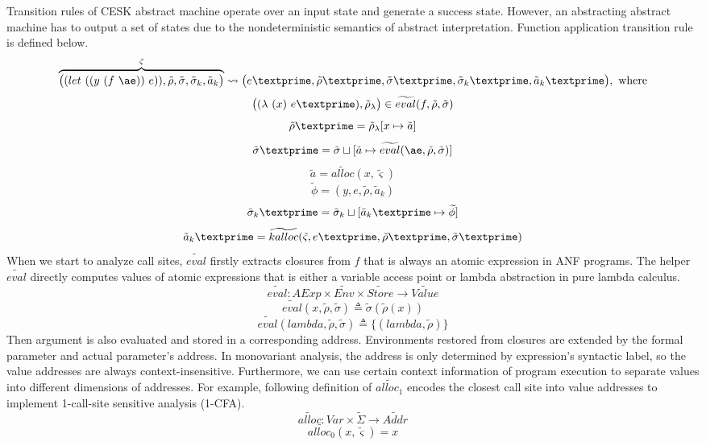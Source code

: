 \documentclass{article}
\begin{document}
Transition rules of CESK abstract machine operate over an input state and generate a success state.
However, an abstracting abstract machine has to output a set of states due to the nondeterministic semantics of abstract interpretation.
Function application transition rule is defined below.
\[
\overbrace{
\big((let\ ((y\ (f\ \ae))\ e)), \tilde{\rho}, \tilde{\sigma}, \tilde{\sigma}_k, \tilde{a}_k \big)
}^{\tilde{\varsigma}}
\leadsto \big(e\textprime,\tilde{\rho}\textprime, \tilde{\sigma}\textprime, \tilde{\sigma}_k\textprime, \tilde{a}_k\textprime \big), \mbox{ where}
\]
\[
\big((\lambda\ (x)\ e\textprime), \tilde{\rho}_{\lambda}  \big) \in \widetilde{eval}(f, \tilde{\rho}, \tilde{\sigma})
\]
\[
\tilde{\rho}\textprime = \tilde{\rho}_{\lambda}[x \mapsto \tilde{a}]
\]
\[
\tilde{\sigma}\textprime = \tilde{\sigma} \sqcup [\tilde{a} \mapsto \widetilde{eval}(\ae, \tilde{\rho}, \tilde{\sigma})]
\]
\[
\tilde{a} = \widetilde{alloc}(x, \tilde{\varsigma})
\]
\[
\widetilde{\phi} = {(y, e, \tilde{\rho}, \tilde{a}_k)}
\]
\[
\tilde{\sigma}_k\textprime = \tilde{\sigma}_k \sqcup [\tilde{a}_k\textprime \mapsto \widetilde{\phi}]
\]
\[
\tilde{a}_k\textprime = \widetilde{kalloc}(\tilde{\varsigma}, e\textprime, \tilde{\rho}\textprime, \tilde{\sigma}\textprime)
\]
When we start to analyze call sites, $\widetilde{eval}$ firstly extracts closures from $f$ that is always an atomic expression in ANF programs.
The helper $\widetilde{eval}$ directly computes values of atomic expressions that is either a variable access point or lambda abstraction in pure lambda calculus.
\[
\widetilde{eval} : AExp \times \widetilde{Env} \times \widetilde{Store} \to \widetilde{Value}
\]
\[
\widetilde{eval}(x, \tilde{\rho}, \tilde{\sigma}) \triangleq \tilde{\sigma}(\tilde{\rho}(x))
\]
\[
\widetilde{eval}(lambda, \tilde{\rho}, \tilde{\sigma}) \triangleq \{(lambda, \tilde{\rho})\}
\]
Then argument is also evaluated and stored in a corresponding address.
Environments restored from closures are extended by the formal parameter and actual parameter's address.
In monovariant analysis, the address is only determined by expression's syntactic label, so the value addresses are always context-insensitive. Furthermore, we can use certain context information of program execution to separate values into different dimensions of addresses.
For example, following definition of $\widetilde{alloc_1}$ encodes the closest call site into value addresses to implement 1-call-site sensitive analysis (1-CFA).
\[
\widetilde{alloc} : Var \times \tilde{\Sigma} \to \widetilde{Addr}
\]
\[
\widetilde{alloc_0} (x, \tilde{\varsigma}) = x
\]
\end{document}
